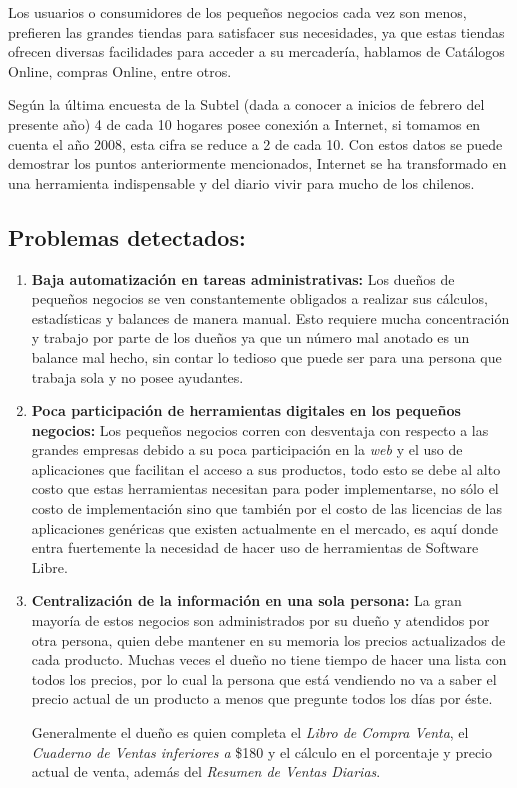 \documentclass[a4paper,12pt]{article}
\begin{document}
    Los usuarios o consumidores de los pequeños negocios cada vez son menos, prefieren las grandes tiendas 
  para satisfacer sus necesidades, ya que estas tiendas ofrecen diversas facilidades para acceder a su 
  mercadería, hablamos de Catálogos Online, compras Online, entre otros. 

    Según la última encuesta de la Subtel \cite{subtel} (dada a conocer a inicios de febrero del presente año) 4 de cada 10 
  hogares posee conexión a Internet, si tomamos en cuenta el año 2008, esta cifra se reduce a 2 de cada 10. Con estos 
  datos se puede demostrar los puntos anteriormente mencionados, Internet se ha transformado en una herramienta
  indispensable y del diario vivir para mucho de los chilenos.

\subsection{Problemas detectados:}
  \begin{enumerate}
   \item \textbf{Baja automatización en tareas administrativas:} Los dueños de pequeños negocios 
   se ven constantemente obligados a realizar sus cálculos, estadísticas y balances de manera manual. 
   Esto requiere mucha concentración y trabajo por parte de los dueños ya que un número mal anotado es un 
   balance mal hecho, sin contar lo tedioso que puede ser para una persona que trabaja sola
   y no posee ayudantes.

\newpage

  \item \textbf{Poca participación de herramientas digitales en los pequeños negocios:} Los pequeños
   negocios corren con desventaja con respecto a las grandes empresas debido a su poca participación en la \emph{web} 
   y el uso de aplicaciones que facilitan el acceso a sus productos, todo esto se debe al alto costo que estas 
   herramientas necesitan para poder implementarse, no sólo el costo de implementación sino que también por 
   el costo de las licencias de las aplicaciones genéricas que existen actualmente en el mercado, es aquí donde
   entra fuertemente la necesidad de hacer uso de herramientas de Software Libre.
  
  \item \textbf{Centralización de la información en una sola persona:} La gran mayoría de estos negocios
   son administrados por su dueño y atendidos por otra persona, quien debe mantener en su memoria los precios
   actualizados de cada producto. Muchas veces el dueño no tiene tiempo de hacer una
   lista con todos los precios, por lo cual la persona que está vendiendo no va a saber el precio actual de un 
   producto a menos que pregunte todos los días por éste.

   Generalmente el dueño es quien completa el \emph{Libro de Compra Venta}, el \emph{Cuaderno de Ventas inferiores a} 
  \$180 y el cálculo en el porcentaje y precio actual de venta, además del \emph{Resumen de Ventas Diarias}.
  \end{enumerate}
\end{document}
